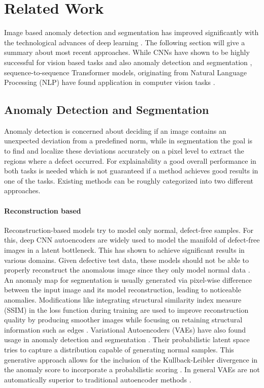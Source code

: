 \documentclass[final,5p,times,twocolumn]{elsarticle}
\begin{document}
	\section{Related Work}
	\label{sec:rel_work}
	Image based anomaly detection and segmentation has improved significantly with the technological advances of deep learning \cite{MvtecAd2019}. The following section will give a summary about most recent approaches. While CNNs have shown to be highly successful for vision based tasks and also anomaly detection and segmentation \cite{MvtecAd2019,Goodfellow-et-al-2016, defard2020padim, ruff2018deeponeclass, 8614226, Bhattad2018DetectingAF}, sequence-to-sequence Transformer models, originating from Natural Language Processing (NLP) have found application in computer vision tasks \cite{dosovitskiy2020, NIPS2017_3f5ee243}.
	
	\subsection{Anomaly Detection and Segmentation}
	Anomaly detection is concerned about deciding if an image contains an unexpected deviation from a predefined norm, while in segmentation the goal is to find and localize these deviations accurately on a pixel level to extract the regions where a defect occurred.
	For explainability a good overall performance in both tasks is needed which is not guaranteed if a method achieves good results in one of the tasks.
	Existing methods can be roughly categorized into two different approaches.
	
	
	\paragraph{Reconstruction based}
	Reconstruction-based models try to model only normal, defect-free samples. For this, deep CNN autoencoders are widely used to model the manifold of defect-free images in a latent bottleneck. This has shown to achieve significant results in various domains. Given defective test data, these models should not be able to properly reconstruct the anomalous image since they only model normal data \cite{CHOW2020101105, Sakurada2014autencoder, Baur_2019, gong2019memorizing}. An anomaly map for segmentation is usually generated via pixel-wise difference between the input image and its model reconstruction, leading to noticeable anomalies.
	Modifications like integrating structural similarity index measure (SSIM) in the loss function during training are used to improve reconstruction quality by producing smoother images while focusing on retaining structural information such as edges \cite{Bergmann2019ssimanom, Wang2004ssim}.
	Variational Autoencoders (VAEs) have also found usage in anomaly detection and segmentation \cite{2018arXiv180701349L, vasilev2018qspace, An2015VariationalAB,Baur_2019}. Their probabilistic latent space tries to capture a distribution capable of generating normal samples. This generative approach allows for the inclusion of the Kullback-Leibler divergence in the anomaly score to incorporate a probabilistic scoring  \cite{2018arXiv180701349L, vasilev2018qspace, An2015VariationalAB}.
	In general VAEs are not automatically superior to traditional autoencoder methods \cite{MvtecAd2019,Baur_2019}.
	
\end{document}
